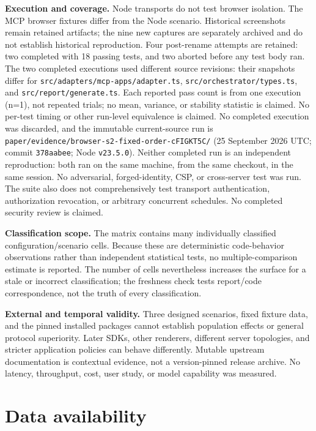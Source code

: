 \documentclass[11pt]{article}
\begin{document}
\textbf{Execution and coverage.} Node transports do not test browser
isolation. The MCP browser fixtures differ from the Node scenario.
Historical screenshots remain retained artifacts; the nine new captures
are separately archived and do not establish historical reproduction.
Four post-rename attempts are retained: two completed with 18 passing
tests, and two aborted before any test body ran. The two completed
executions used different source revisions: their snapshots differ for
\texttt{src/adapters/mcp-apps/adapter.ts},
\texttt{src/orchestrator/types.ts}, and \texttt{src/report/generate.ts}.
Each reported pass count is from one execution (n=1), not repeated
trials; no mean, variance, or stability statistic is claimed. No
per-test timing or other run-level equivalence is claimed. No completed
execution was discarded, and the immutable current-source run is
\texttt{paper/evidence/browser-s2-fixed-order-cFIGKT5C/} (25 September
2026 UTC; commit \texttt{378aabee}; Node \texttt{v23.5.0}). Neither
completed run is an independent reproduction: both ran on the same
machine, from the same checkout, in the same session. No adversarial,
forged-identity, CSP, or cross-server test was run. The suite also does
not comprehensively test transport authentication, authorization
revocation, or arbitrary concurrent schedules. No completed security
review is claimed.

\textbf{Classification scope.} The matrix contains many individually
classified configuration/scenario cells. Because these are deterministic
code-behavior observations rather than independent statistical tests, no
multiple-comparison estimate is reported. The number of cells
nevertheless increases the surface for a stale or incorrect
classification; the freshness check tests report/code correspondence,
not the truth of every classification.

\textbf{External and temporal validity.} Three designed scenarios, fixed
fixture data, and the pinned installed packages cannot establish
population effects or general protocol superiority. Later SDKs, other
renderers, different server topologies, and stricter application
policies can behave differently. Mutable upstream documentation is
contextual evidence, not a version-pinned release archive. No latency,
throughput, cost, user study, or model capability was measured.

\section{Data availability}\label{data-availability}
\end{document}
